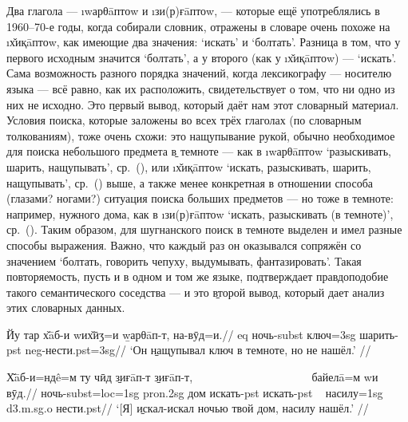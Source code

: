 Два глагола — \i{wарθāптоw} и \i{зи(р)ғāптоw}, — которые ещё употреблялись в 1960–70-е годы, когда собирали словник, отражены в словаре очень похоже на \i{х̌иқāптоw}, как имеющие два значения: ‘искать’ и ‘болтать’. Разница в том, что у первого исходным значится ‘болтать’, а у второго (как у \i{х̌иқāптоw}) — ‘искать’. Сама возможность разного порядка значений, когда лексикографу — носителю языка — всё равно, как их расположить, свидетельствует о том, что ни одно из них не исходно. Это \b{первый вывод}, который даёт нам этот словарный материал. Условия поиска, которые заложены во всех трёх глаголах (по словарным толкованиям), тоже очень схожи: это нащупывание рукой, обычно необходимое для поиска небольшого предмета \b{в темноте} — как в \i{wарθāптоw} ‘разыскивать, шарить, нащупывать’, ср.~(), или \i{х̌иқāптоw} ‘искать, разыскивать, шарить, нащупывать’, ср.~() выше, а также менее конкретная в отношении способа (глазами? ногами?) ситуация поиска больших предметов — но тоже в темноте: например, нужного дома, как в \i{зи(р)ғāптоw} ‘искать, разыскивать (в темноте)’, ср.~(). Таким образом, для шугнанского поиск в темноте выделен и имел разные способы выражения. Важно, что каждый раз он оказывался сопряжён со значением ‘болтать, говорить чепуху, выдумывать, фантазировать’. Такая повторяемость, пусть и в одном и том же языке, подтверждает правдоподобие такого семантического соседства — и это \b{второй вывод}, который дает анализ этих словарных данных.

\begingl
\gla Йу тар х̌āб-и wих̌ӣӡ=и \b{wарθāп-т}, на-вӯд=и.//
 {\sc eq} ночь-{\sc subst} ключ={\sc 3sg} шарить-{\sc pst} {\sc neg}-нести.{\sc pst=3sg}//
\glft ‘Он \b{нащупывал} ключ в темноте, но не нашёл.’ //
\endgl \xe

\begingl
\gla Х̌āб-и=ндê=м ту чӣд \b{зиғāп-т} \b{зиғāп-т}, ~~~~~~~~~~~~~~~~~~~~ байелā=м wи вӯд.//
\glc ночь-{\sc subst=loc=1sg} {\sc pron.2sg} дом искать-{\sc pst} искать-{\sc pst} ~ насилу={\sc 1sg} {\sc d3.m.sg.o} нести.{\sc pst}//
\glft ‘[Я] \b{искал-искал} ночью твой дом, насилу нашёл.’ //
\endgl \xe

